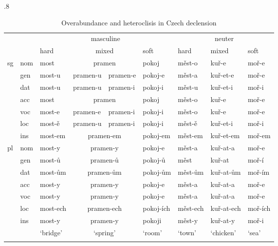 \documentclass[output=paper]{langscibook}
\begin{document}
\begin{table}[htb]
  \centering\smaller
  \tabcolsep.8\tabcolsep %
\begin{tabular}{ll|ll@{$\sim$}ll|lll}
\lsptoprule
& & \multicolumn{4}{c}{\sc masculine} & \multicolumn{3}{c}{\sc neuter}\\
& & hard & \multicolumn{2}{c}{mixed} & soft & hard & mixed & soft\\
\midrule
\multirow{6}{*}{\sc sg} & \sc nom & most & \multicolumn{2}{c}{pramen} & pokoj & měst-o & kuř-e & moř-e\\
& \sc gen & most-u & pramen-u&pramen-e & pokoj-e & měst-a & kuř-et-e & moř-e\\
& \sc dat & most-u & pramen-u&pramen-i & pokoj-i & měst-u & kuř-et-i & moř-i\\
& \sc acc & most & \multicolumn{2}{c}{pramen} & pokoj & měst-o & kuř-e & moř-e\\
& \sc voc & most-e & pramen-e & pramen-i & pokoj-i & měst-o & kuř-e & moř-e\\
& \sc loc & most-ě & pramen-u & pramen-i & pokoj-i & měst-ě & kuř-et-i & moř-i\\
& \sc ins & most-em & \multicolumn{2}{c}{pramen-em} & pokoj-em & měst-em & kuř-et-em & moř-em\\
\midrule
\multirow{6}{*}{\sc pl} & \sc nom & most-y & \multicolumn{2}{c}{pramen-y} & pokoj-e & měst-a & kuř-at-a & moř-e\\
& \sc gen & most-ů & \multicolumn{2}{c}{pramen-ů} & pokoj-ů & měst & kuř-at & moř-í\\
& \sc dat & most-ům & \multicolumn{2}{c}{pramen-ům} & pokoj-ům & měst-ům & kuř-at-ům & moř-ím\\
& \sc acc & most-y & \multicolumn{2}{c}{pramen-y} & pokoj-e & měst-a & kuř-at-a & moř-e\\
& \sc voc & most-y & \multicolumn{2}{c}{pramen-y} & pokoj-e & měst-a & kuř-at-a & moř-e\\
& \sc loc & most-ech & \multicolumn{2}{c}{pramen-ech} & pokoj-ích & měst-ech & kuř-at-ech & moř-ích\\
& \sc ins & most-y & \multicolumn{2}{c}{pramen-y} & pokoji & měst-y & kuř-at-y & moř-i\\
\midrule
& & ‘bridge’ & \multicolumn{2}{c}{‘spring’} & ‘room’ & ‘town’ & ‘chicken’ & ‘sea’\\
\lspbottomrule
\end{tabular}
\caption{Overabundance and heteroclisis in Czech declension \citep{Bonami17b}}
\label{tab:cz:ov}
\end{table}
\end{document}
